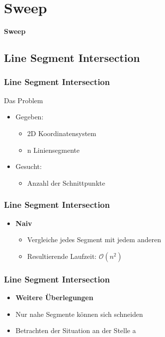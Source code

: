 \section{Sweep}
\begin{frame}
	\begin{center}
		\textbf{Sweep}
	\end{center}
\end{frame}

\subsection{Line Segment Intersection}
\begin{frame}
	\frametitle{{Line Segment Intersection}}
	\begin{block}{Das Problem}
	\begin{itemize}
		\pause
		\item{Gegeben:}
		\pause
		\begin{itemize}
			\item{2D Koordinatensystem}
			\pause
			\item{n Liniensegmente}
		\end{itemize}
		\pause
		\item{Gesucht:}
		\pause
		\begin{itemize}
			\item{Anzahl der Schnittpunkte}
		\end{itemize}
	\end{itemize}
	\end{block}
\end{frame}
\begin{frame}
	\frametitle{{Line Segment Intersection}}
	\begin{itemize}
		\item \textbf{Naiv}
		\begin{itemize}
			\pause
			\item{Vergleiche jedes Segment mit jedem anderen}
			\pause
			\item{Resultierende Laufzeit: $\mathcal O(n^2)$}
		\end{itemize}
	\end{itemize}
\end{frame}
\begin{frame}
	\frametitle{{Line Segment Intersection}}
	\begin{itemize}
		\item \textbf{Weitere \"Uberlegungen}
		\pause
		\item{Nur nahe Segmente k\"onnen sich schneiden}
		\pause
		\item{Betrachten der Situation an der Stelle a}
	\end{itemize}
\end{frame}

